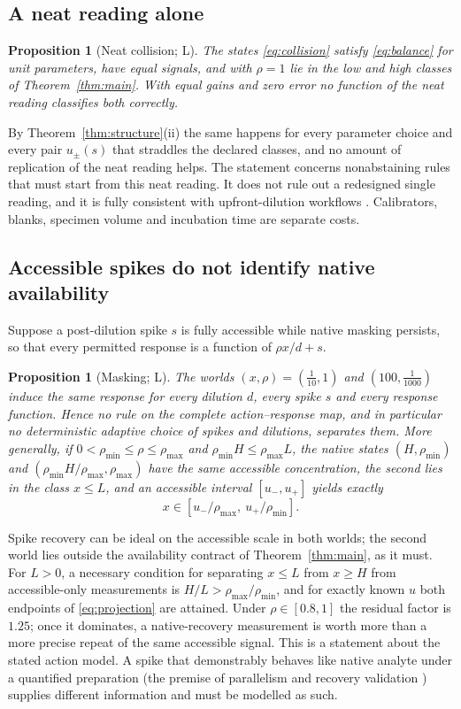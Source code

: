\documentclass[11pt]{article}
\theoremstyle{plain}
\newtheorem{proposition}[theorem]{Proposition}
\theoremstyle{definition}
\numberwithin{equation}{section}
\newcommand{\Lean}{\textsf{L}}   %
\begin{document}
\subsection{A neat reading alone}
\begin{proposition}[Neat collision; \Lean]\label{prop:neat}
The states \eqref{eq:collision} satisfy \eqref{eq:balance} for unit parameters,
have equal signals, and with $\rho=1$ lie in the low and high classes of
Theorem~\ref{thm:main}. With equal gains and zero error no function of the neat
reading classifies both correctly.
\end{proposition}
By Theorem~\ref{thm:structure}(ii) the same happens for every parameter choice and
every pair $u_\pm(s)$ that straddles the declared classes, and no amount of
replication of the neat reading helps. The statement concerns nonabstaining rules
that must start from this neat reading. It does not rule out a redesigned single
reading, and it is fully consistent with upfront-dilution workflows \cite{wu2018}.
Calibrators, blanks, specimen volume and incubation time are separate costs.

\subsection{Accessible spikes do not identify native availability}
Suppose a post-dilution spike $s$ is fully accessible while native masking
persists, so that every permitted response is a function of $\rho x/d+s$.

\begin{proposition}[Masking; \Lean]\label{prop:mask}
The worlds $(x,\rho)=(\frac1{10},1)$ and $(100,\frac1{1000})$ induce the same response
for every dilution $d$, every spike $s$ and every response function. Hence no
rule on the complete action--response map, and in particular no deterministic
adaptive choice of spikes and dilutions, separates them. More generally, if
$0<\rho_{\min}\le\rho\le\rho_{\max}$ and $\rho_{\min}H\le\rho_{\max}L$, the native
states $(H,\rho_{\min})$ and $(\rho_{\min}H/\rho_{\max},\rho_{\max})$ have the same
accessible concentration, the second lies in the class $x\le L$, and an accessible
interval $[u_-,u_+]$ yields exactly
\begin{equation}\label{eq:projection}
 x\in[u_-/\rho_{\max},\ u_+/\rho_{\min}] .
\end{equation}
\end{proposition}
Spike recovery can be ideal on the accessible scale in both worlds; the second
world lies outside the availability contract of Theorem~\ref{thm:main}, as it must.
For $L>0$, a necessary condition for separating $x\le L$ from $x\ge H$ from
accessible-only measurements is $H/L>\rho_{\max}/\rho_{\min}$, and for exactly known
$u$ both endpoints of \eqref{eq:projection} are attained. Under $\rho\in[0.8,1]$ the
residual factor is $1.25$; once it dominates, a native-recovery measurement is
worth more than a more precise repeat of the same accessible signal. This is a
statement about the stated action model. A spike that demonstrably behaves like
native analyte under a quantified preparation (the premise of parallelism and
recovery validation \cite{desilva2003,ichm10}) supplies different information and
must be modelled as such.
\end{document}
